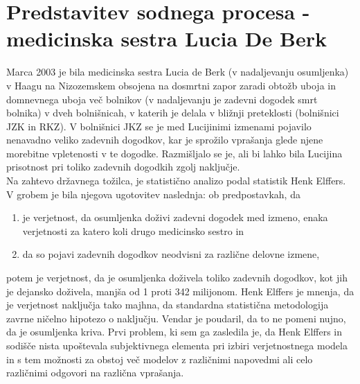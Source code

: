 \documentclass[fin1, tisk]{fmfdelo}
\theoremstyle{definition} %
\theoremstyle{trditev} %
\theoremstyle{izrek}
\begin{document}
\section{Predstavitev sodnega procesa - medicinska sestra Lucia De Berk}
Marca 2003 je bila medicinska sestra Lucia de Berk (v nadaljevanju osumljenka) v Haagu na Nizozemskem obsojena na dosmrtni zapor zaradi obtožb 
uboja in domnevnega uboja več bolnikov (v nadaljevanju je zadevni dogodek smrt bolnika) v dveh bolnišnicah, v katerih je delala v bližnji preteklosti (bolnišnici JZK in RKZ). V bolnišnici JKZ 
se je med Lucijinimi izmenami pojavilo nenavadno veliko zadevnih dogodkov, kar je sprožilo vprašanja glede njene morebitne vpletenosti v te dogodke. 
Razmišljalo se je, ali bi lahko bila Lucijina prisotnost pri toliko zadevnih dogodkih zgolj naključje.\\
Na zahtevo državnega tožilca, je statistično analizo podal statistik Henk Elffers. V grobem je bila njegova ugotovitev naslednja: ob predpostavkah, da
\begin{enumerate}
    \item je verjetnost, da osumljenka doživi zadevni dogodek med izmeno, enaka verjetnosti za katero koli drugo medicinsko sestro in
    \item da so pojavi zadevnih dogodkov neodvisni za različne delovne izmene,
\end{enumerate}
potem je verjetnost, da je osumljenka doživela toliko zadevnih dogodkov, kot jih je dejansko doživela, manjša od 1 proti 342 milijonom. Henk Elffers je mnenja, 
da je verjetnost naključja tako majhna, da standardna statistična metodologija zavrne ničelno hipotezo o naključju. Vendar je poudaril, da 
to ne pomeni nujno, da je osumljenka kriva. Prvi problem, ki sem ga zasledila je, da Henk Elffers in sodišče nista upoštevala subjektivnega 
elementa pri izbiri verjetnostnega modela in s tem možnosti za obstoj več modelov z različnimi napovedmi ali celo različnimi odgovori 
na različna vprašanja. 

\end{document}
